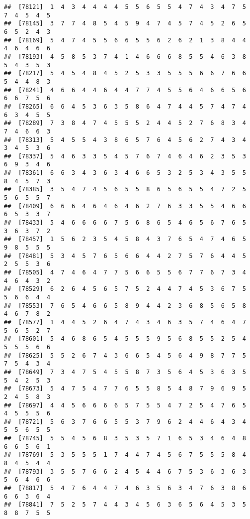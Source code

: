 \documentclass[
]{book}
\begin{document}
\begin{verbatim}
##  [78121]  1  4  3  4  4  4  4  5  5  6  5  5  4  7  4  3  4  7  5  7  4  5  4  5
##  [78145]  3  7  7  4  8  5  4  5  9  4  7  4  5  7  4  5  2  6  5  6  5  2  4  3
##  [78169]  5  4  7  4  5  5  6  6  5  5  6  2  6  2  1  3  8  4  4  4  6  4  6  6
##  [78193]  4  5  8  5  3  7  4  1  4  6  6  6  8  5  5  4  6  3  8  5  4  3  5  3
##  [78217]  5  4  5  4  8  4  5  2  5  3  3  5  5  5  6  6  7  6  6  5  4  4  8  3
##  [78241]  4  6  6  4  4  6  4  4  7  7  4  5  5  6  4  6  6  5  6  6  6  7  5  6
##  [78265]  6  6  4  5  3  6  3  5  8  6  4  7  4  4  5  7  4  7  4  6  3  4  5  5
##  [78289]  7  3  8  4  7  4  5  5  5  2  4  4  5  2  7  6  8  3  4  7  4  6  6  3
##  [78313]  5  4  5  5  4  3  8  6  5  7  6  4  5  6  2  7  4  3  4  3  4  5  3  6
##  [78337]  5  4  6  3  3  5  4  5  7  6  7  4  6  4  6  2  3  5  3  6  9  3  4  6
##  [78361]  6  6  3  4  3  6  3  4  6  6  5  3  2  5  3  4  3  5  5  8  4  5  7  3
##  [78385]  3  5  4  7  4  5  6  5  5  8  6  5  6  5  5  4  7  2  5  5  6  5  5  7
##  [78409]  6  6  6  4  6  4  6  4  6  2  7  6  3  3  5  5  4  6  6  6  5  3  3  7
##  [78433]  5  4  6  6  6  6  7  5  6  8  6  5  4  6  5  6  7  6  5  3  6  3  7  2
##  [78457]  1  5  6  2  3  5  4  5  8  4  3  7  6  5  4  7  4  6  5  9  8  5  5  5
##  [78481]  5  3  4  5  7  6  5  6  6  4  4  2  7  5  7  6  4  4  5  2  5  5  3  6
##  [78505]  4  7  4  6  4  7  7  5  6  6  5  5  6  7  7  6  7  3  4  4  6  4  3  2
##  [78529]  6  2  6  4  5  6  5  7  5  2  4  4  7  4  5  3  6  7  5  5  6  6  4  4
##  [78553]  7  6  5  4  6  6  5  8  9  4  4  2  3  6  8  5  6  5  8  4  6  7  8  2
##  [78577]  1  4  4  5  2  6  4  7  4  3  4  6  3  5  7  4  6  4  7  5  6  5  2  7
##  [78601]  5  4  6  8  6  5  4  5  5  5  9  5  6  8  5  5  2  5  4  5  5  5  6  6
##  [78625]  5  5  2  6  7  4  3  6  6  5  4  5  6  4  9  8  7  7  5  7  5  4  3  4
##  [78649]  7  3  4  7  5  4  5  5  8  7  3  5  6  4  5  3  6  3  5  5  4  2  5  3
##  [78673]  5  4  7  5  4  7  7  6  5  5  8  5  4  8  7  9  6  9  5  2  4  5  8  3
##  [78697]  4  4  5  6  6  6  6  5  7  5  5  4  7  2  5  4  7  6  5  4  5  5  5  6
##  [78721]  5  6  3  7  6  6  5  5  3  7  9  6  2  4  4  6  4  3  4  5  5  6  5  5
##  [78745]  5  5  4  5  6  8  3  5  3  5  7  1  6  5  3  4  6  4  8  6  6  5  6  1
##  [78769]  5  3  5  5  5  1  7  4  4  7  4  5  6  7  5  5  5  8  4  8  4  5  4  4
##  [78793]  3  5  5  7  6  6  2  4  5  4  4  6  7  5  3  6  3  6  3  5  6  4  6  6
##  [78817]  5  4  7  6  4  4  7  4  6  3  5  6  3  4  7  6  3  8  6  6  6  3  6  4
##  [78841]  7  5  2  5  7  4  4  3  4  5  6  3  6  5  6  4  5  3  5  8  8  7  5  5

\end{verbatim}
\end{document}
